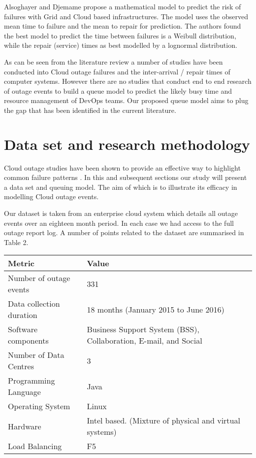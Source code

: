 \documentclass[5p]{elsarticle}
\begin{document}
Alsoghayer and Djemame \cite {alsoghayer2014resource} propose a mathematical model to predict the risk of failures with Grid and Cloud based infrastructures. The model uses the observed mean time to failure and the mean to repair for prediction. The authors found the best model to predict the time between failures is a Weibull distribution, while the repair (service) times as best modelled by a lognormal distribution.

As can be seen from the literature review a number of studies have been conducted into Cloud outage failures and the inter-arrival / repair times of computer systems. However there are no studies that conduct end to end research of outage events to build a queue model to predict the likely busy time and resource management of DevOps teams. Our proposed queue model aims to plug the gap that has been identified in the current literature.

\section{Data set and research methodology}

Cloud outage studies have been shown to provide an effective way to highlight common failure patterns \cite{InfoWorld2015outage}. In this and subsequent sections our study will present a data set and queuing model. The aim of which is to illustrate its efficacy in modelling Cloud outage events. 

Our dataset is taken from an enterprise cloud system which details all outage events over an eighteen month period. In each case we had access to the full outage report log. A number of points related to the dataset are summarised in Table 2. 

\begin {table*}[]
\caption {Summary of dataset metrics} 
\begin{center}
\begin{tabular}{p{4cm} |  p{11cm}} \hline \bf{Metric} & \bf{Value}
\\ \hline Number of outage events & 331 
\\ Data collection duration & 18 months (January 2015 to June 2016) 
\\ Software components & Business Support System (BSS), Collaboration, E-mail, and Social  	
\\ Number of Data Centres & 3 
\\ Programming Language & Java 
\\ Operating System & Linux 
\\ Hardware & Intel based. (Mixture of physical and virtual systems)
\\ Load Balancing & F5
\\ \hline
\end{tabular}
\end{center}
\end{table*}
\end{document}
